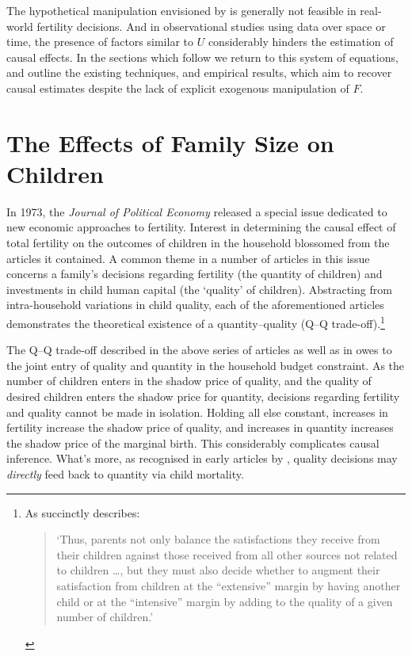 The hypothetical manipulation envisioned by \citeauthor{Haavelmo1943} is 
generally not feasible in real-world fertility decisions. And in observational
studies using data over space or time, the presence of factors similar to $U$
considerably hinders the estimation of causal effects.  In the sections which
follow we return to this system of equations, and outline the existing 
techniques, and empirical results, which aim to recover causal estimates despite
the lack of explicit exogenous manipulation of $F$.

\section{The Effects of Family Size on Children}
\label{Fscn:kids}
In 1973, the \emph{Journal of Political Economy} released a special issue 
dedicated to new economic approaches to fertility.  Interest in determining
the causal effect of total fertility on the outcomes of children in the 
household blossomed from the articles it contained.  A common theme in a number 
of articles in this issue \citep{BeckerLewis1973, DeTray1973, Willis1973} 
concerns a family's decisions regarding fertility (the quantity of children) 
and investments in child human capital (the `quality' of children). Abstracting 
from intra-household variations in child quality, each of the aforementioned
articles demonstrates the theoretical existence of a quantity--quality
(Q--Q trade-off).\footnote{As \citet{Willis1973} succinctly describes:
\begin{quote}
`Thus, parents not only balance the satisfactions they receive from their
children against those received from all other sources not related to 
children \ldots, but they must also decide whether to augment their 
satisfaction from children at the ``extensive'' margin by having another
child or at the ``intensive'' margin by adding to the quality of a given
number of children.'
\end{quote}
}

The Q--Q trade-off described in the above series of articles as well as in
\citet{BeckerTomes1976,BeckerTomes1986} owes to the joint entry of quality and 
quantity in the household budget constraint.  As the number of children 
enters in the shadow price of quality, and the quality of desired children 
enters the shadow price for quantity, decisions regarding fertility and quality 
cannot be made in isolation.  Holding all else constant, increases in fertility 
increase the shadow price of quality, and increases in quantity increases the
shadow price of the marginal birth. This considerably complicates causal 
inference. What's more, as recognised in early articles by \citet{%
BenPorathWelch1972,BenPorath1976}, quality decisions may \emph{directly} feed 
back to quantity via child mortality.


